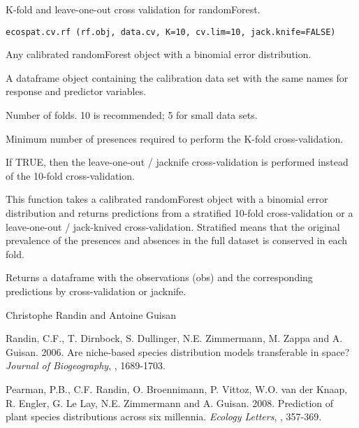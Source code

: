 \documentclass[a4paper]{book}
\begin{document}
%
\begin{Description}\relax
K-fold and leave-one-out cross validation for randomForest.
\end{Description}
%
\begin{Usage}
\begin{verbatim}
ecospat.cv.rf (rf.obj, data.cv, K=10, cv.lim=10, jack.knife=FALSE)
\end{verbatim}
\end{Usage}
%
\begin{Arguments}
\begin{ldescription}
\item[\code{rf.obj}] Any calibrated randomForest object with a binomial error distribution.
\item[\code{data.cv}] A dataframe object containing the calibration data set with the same names for response and predictor variables.
\item[\code{K}] Number of folds. 10 is recommended; 5 for small data sets.
\item[\code{cv.lim}] Minimum number of presences required to perform the K-fold cross-validation.
\item[\code{jack.knife}] If TRUE, then the leave-one-out / jacknife cross-validation is performed instead of the 10-fold cross-validation.
\end{ldescription}
\end{Arguments}
%
\begin{Details}\relax
This function takes a calibrated randomForest object with a binomial error distribution and returns predictions from a stratified 10-fold cross-validation or a leave-one-out / jack-knived cross-validation. Stratified means that the original prevalence of the presences and absences in the full dataset is conserved in each fold.
\end{Details}
%
\begin{Value}
Returns a dataframe with the observations (obs) and the corresponding predictions by cross-validation or jacknife.
\end{Value}
%
\begin{Author}\relax
Christophe Randin  and Antoine Guisan 
\end{Author}
%
\begin{References}\relax
Randin, C.F., T. Dirnbock, S. Dullinger, N.E. Zimmermann, M. Zappa and A. Guisan. 2006. Are niche-based species distribution models transferable in space? \emph{Journal of Biogeography}, , 1689-1703.


Pearman, P.B., C.F. Randin, O. Broennimann, P. Vittoz, W.O. van der Knaap, R. Engler, G. Le Lay, N.E. Zimmermann and A. Guisan. 2008. Prediction of plant species distributions across six millennia. \emph{Ecology Letters}, , 357-369.
\end{References}
\end{document}
